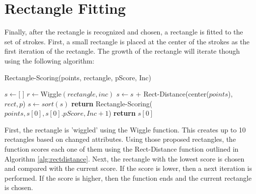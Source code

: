 \section{Rectangle Fitting}
\label{sec:rectfitting}

Finally, after the rectangle is recognized and chosen, a rectangle is fitted to the set of strokes. First, a small rectangle is placed at the center of the strokes as the first iteration of the rectangle. The growth of the rectangle will iterate though using the following algorithm:


\begin{algorithm}
\caption{Rectangle-Scoring(points, rectangle, pScore, Inc)}
\begin{algorithmic}[1]
\State $s \gets $[ ]
\State $r \gets  $Wiggle$(rectangle, inc)$
        \State $s \gets s$ + Rect-Distance(center($points$), $rect, p$)
    \EndFor
\EndFor
\State $s \gets sort(s)$ 
    \State \textbf{return} Rectangle-Scoring($points, s[0], s[0].pScore, Inc + 1$)
\Else
    \State \textbf{return} $s[0]$
\EndIf
\end{algorithmic}
\end{algorithm}

First, the rectangle is 'wiggled' using the Wiggle function. This creates up to 10 rectangles based on changed attributes. Using those proposed rectangles, the function scores each one of them using the Rect-Distance function outlined in Algorithm \ref{alg:rectdistance}. Next, the rectangle with the lowest score is chosen and compared with the current score. If the score is lower, then a next iteration is performed. If the score is higher, then the function ends and the current rectangle is chosen.

